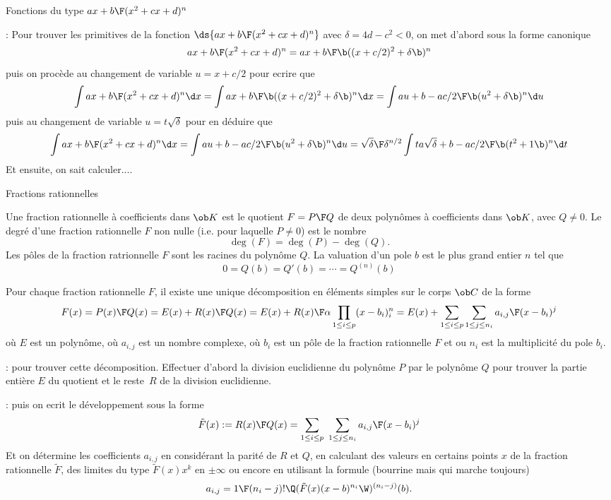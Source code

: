 \Concept [Index=Primitives!des fonctions du type@des fonctions du type ${ax+b\F (x^2+cx+d)^n}$] Fonctions du type ${ax+b\F (x^2+cx+d)^n}$

\Remarque : Pour trouver les primitives de la fonction $\ds{ax+b\F(x^2+cx+d)^n}$ avec $\delta=4d-c^2< 0$, on met d'abord sous la forme canonique 
$$
{ax+b\F(x^2+cx+d)^n}={ax+b\F \b((x+c/2)^2+\delta\b)^n}
$$
puis on proc\`ede au changement de variable $u=x+c/2$ pour ecrire que 
$$
\int{ax+b\F(x^2+cx+d)^n}\d x=\int {ax+b\F \b((x+c/2)^2+\delta\b)^n}\d x=\int {au+b-ac/2\F \b(u^2+\delta\b)^n}\d u
$$
puis au changement de variable $u=t\sqrt\delta$ pour en d\'eduire que 
$$
\int{ax+b\F(x^2+cx+d)^n}\d x=\int {au+b-ac/2\F \b(u^2+\delta\b)^n}\d u
={\sqrt\delta\F\delta^{n/2}}\int {ta\sqrt\delta +b-ac/2\F \b(t^2+1\b)^n}\d t
$$
Et ensuite, on sait calculer....
\bigskip


\Concept [Index=Fractionsrationnelles@Fractions rationnelles!definition@d\'efinition] Fractions rationnelles

\Definition []  Une fraction rationnelle \`a coefficients dans $\ob K$ est le quotient $F={P\F Q}$ de deux polyn\^omes \`a coefficients dans $\ob K$, avec $Q\neq0$.
Le degr\'e d'une fraction rationnelle $F$ non nulle (i.e. pour laquelle $P\neq0$) est le nombre 
$$
\deg(F)=\deg(P)-\deg(Q).
$$
Les p\^oles de la fraction ratrionnelle $F$ sont les racines du polyn\^ome $Q$. La valuation d'un pole $b$ est le plus grand entier $n$ tel que 
$$
0=Q(b)=Q'(b)=\cdots=Q^{(n)}(b)
$$
\bigskip


\Propriete []  Pour chaque fraction rationnelle $F$, il existe une unique d\'ecomposition en \'el\'ements simples 
sur le corps $\ob C$ de la forme
$$
F(x)={P(x)\F Q(x)}=E(x)+{R(x)\F Q(x)}=E(x)+{R(x)\F \alpha\prod_{1\le i\le p}(x-b_i)^n_i}
=E(x)+\sum_{1\le i\le p}\sum_{1\le j\le n_i}{a_{i,j}\F (x-b_i)^j}
$$
o\`u $E$ est un polyn\^ome, o\`u $a_{i,j}$ est un nombre complexe, o\`u $b_i$ est un p\^ole de la fraction
rationnelle $F$ et ou $n_i$ est la multiplicit\'e du pole $b_i$. 
\bigskip

\Remarque : pour trouver cette d\'ecomposition. Effectuer d'abord la division euclidienne du polyn\^ome $P$ par le polyn\^ome $Q$ pour trouver la partie enti\`ere $E$ du quotient et le reste~$R$ de la division euclidienne. 
\bigskip

\Remarque : puis on ecrit le d\'eveloppement sous la forme 
$$
\tilde F(x):={R(x)\F Q(x)}=\sum_{1\le i\le p}\ \sum_{1\le j\le n_i}{a_{i,j}\F (x-b_i)^j}
$$
Et on d\'etermine les coefficients $a_{i,j}$ en consid\'erant la parit\'e de $R$ et $Q$, en calculant des valeurs en certains points $x$ de la fraction rationnelle $\tilde F$, des limites du type $\tilde F(x)x^k$ en $\pm\infty$ ou encore en utilisant la formule (bourrine mais qui marche toujours) 
$$
a_{i,j}={1\F (n_i-j)!}\Q(\tilde F(x)(x-b)^{n_i}\W)^{(n_i-j)}(b).
$$

